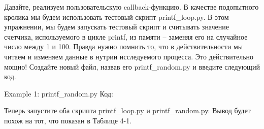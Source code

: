 \documentclass[12pt, a4paper, oneside]{book}
\begin{document}
Давайте, реализуем пользовательскую callback-функцию. В качестве подопытного кролика мы будем использовать тестовый скрипт printf\_loop.py. В этом упражнении, мы будем запускать тестовый скрипт и считывать значение счетчика, используемого в цикле printf, из памяти – заменяя его на случайное число между 1 и 100. Правда нужно помнить то, что в действительности мы читаем и изменяем данные в нутрии исследуемого процесса. Это действительно мощно! Создайте новый файл, назвав его printf\_random.py и введите следующий код.

Example 1: printf\_random.py
Код:











Теперь запустите оба скрипта printf\_loop.py и printf\_random.py. Вывод будет похож на тот, что показан в Таблице 4-1.
\end{document}
